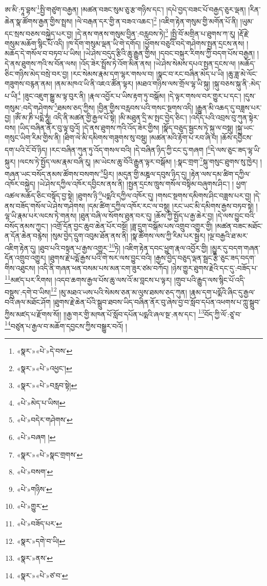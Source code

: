 ཨ་མི་:ཏཱ་བྷས་\footnote{«སྣར་»«པེ་»དེ་བས་}སྤྱི་གཙུག་བརྒྱན། །མཚན་བཟང་སུམ་ཅུ་རྩ་གཉིས་དང་། །དཔེ་བྱད་བཟང་པོ་བརྒྱད་ཅུར་ལྡན། །རིན་ཆེན་སྣ་ཚོགས་རྒྱན་གྱིས་སྤྲས། །ལེ་བརྒན་དར་གྱི་ན་བཟའ་འཆང་།\footnote{«སྣར་»«པེ་»འཕྱང་།} །འཇིག་རྟེན་གསུམ་གྱི་མགོན་པོ་ནི། །ཡུམ་དང་སྲས་བཅས་བསྐྱེད་པར་བྱ། །དེ་ནས་གནས་གསུམ་བྱིན་:བརླབས་ཏེ།\footnote{«སྣར་»«པེ་»བརླབ་སྟེ།} །སྤྱི་བོ་མགྲིན་པ་ཐུགས་ཀ་རུ། །རྡོ་རྗེ་གསུམ་མཆོག་སྙིང་པོ་འདི། །ཁ་དོག་གསུམ་ལྡན་ཡི་གེ་དགོད། །ཕྱོགས་བཅུའི་བདེ་གཤེགས་སྤྱན་དྲངས་ནས། །མཆོད་དེ་གསོལ་བ་བཏབ་པ་ཡིས། །ཡེ་ཤེས་བདུད་རྩིའི་ཆུ་རྒྱུན་གྱིས། །དབང་བསྐུར་རིགས་ཀྱི་བདག་པོས་བརྒྱན། །དེ་ནས་ཐུགས་ཀའི་ས་བོན་ལས། །འོད་ཟེར་སྤྲོས་ཏེ་འོག་མིན་ནས། །ཡེ་ཤེས་སེམས་དཔའ་སྤྱན་དྲངས་ལ། །མཆོད་ཅིང་གཉིས་མེད་བསྲེ་བར་བྱ། །རང་སེམས་རྣམ་དག་ལྷར་གསལ་བ། །སྣང་བ་རང་བཞིན་མེད་པ་ཡི། །ཆུ་ཟླ་མེ་ལོང་གཟུགས་བརྙན་ནམ། །ནམ་མཁའ་ཡི་ནི་འཇའ་ཚོན་ལྟར། །མཐའ་གཉིས་ལས་གྲོལ་ལྷ་ཡི་སྐུ། །སྐུ་བཅས་སྐུ་ནི་:མེད་པ་ཡི།\footnote{«པེ་»མེད་པ་ཡིས།} །ཟུང་འཇུག་སྒྱུ་མ་ལྟ་བུར་ནི། །རྣལ་འབྱོར་པ་ཡིས་རྟག་ཏུ་བསྒོམ། །དེ་ལྟར་གསལ་བར་གྱུར་པ་དང་། །དུས་གསུམ་:བདེ་གཤེགས་\footnote{«པེ་»བདེར་གཤེགས་}ཐམས་ཅད་ཀྱིས། །བྱིན་གྱིས་བརླབས་པའི་གསང་སྔགས་འདི། །རྒྱུན་མི་འཆད་དུ་བཟླས་པར་བྱ། །ཨོཾ་མ་ཎི་པདྨེ་ཧཱུཾ། འདི་ནི་མཚན་གྱི་རྒྱལ་པོ་སྟེ། །མི་མཐུན་དྲི་མ་སྤང་བྱེད་ཅིང་། །འདོད་པའི་འབྲས་བུ་ཀུན་སྟེར་བས། །ཡིད་བཞིན་ནོར་བུ་ལྟ་བུའོ། །དེ་ནས་ཐུགས་ཀའི་འོད་ཟེར་གྱིས། །སྣོད་བཅུད་སྦྱངས་ཏེ་སྐུ་ལ་བསྡུ། །སྐུ་ཡང་གསུང་ཡིག་རིམ་གྱིས་ནི། །ཐིག་ལེ་མི་དམིགས་གཟུགས་སུ་བསྡུ། །མཚན་མའི་རྟོག་པ་རབ་ཞི་བ། །ཆོས་དབྱིངས་དག་པའི་ངོ་བོ་ཉིད། །རང་བཞིན་ཀུན་ཏུ་འོད་གསལ་བའི། །དེ་བཞིན་ཉིད་ཀྱི་ངང་དུ་གཞག །\footnote{«པེ་»བཞག །}དེ་ལས་ཅུང་ཟད་ལྷ་ཡི་སྐུར། །ལངས་ཏེ་སྤྱོད་ལམ་རྣམ་བཞི་རུ། །མ་ཡེངས་ཆུ་བོའི་རྒྱུན་ལྟར་བསྒོམ། །:སྣང་གྲག་\footnote{«སྣར་»«པེ་»སྣང་གྲགས་}སྐུ་གསུང་ཐུགས་སུ་ཁྱེར། །གཞན་ཡང་བསོད་ནམས་ཚོགས་བསགས་\footnote{«པེ་»བསག་}ཕྱིར། །མདུན་གྱི་མཎྜལ་དབུས་ཉིད་དུ། །རྟེན་ལས་དམ་ཚིག་དཀྱིལ་འཁོར་བསྐྱེད། །ཡེ་ཤེས་དཀྱིལ་འཁོར་དབྱིངས་ནས་ནི། །སྤྱན་དྲངས་ཁྲུས་གསོལ་བསྟིམ་བཞུགས་ཤིང་། །
ཕྱག་འཚལ་མཆོད་ཅིང་བསྟོད་བྱ་སྟེ། །ཐུགས་ཉི་\footnote{«པེ་»གཉིས་}པདྨའི་དཀྱིལ་འཁོར་དུ། །གསང་སྔགས་དམིགས་ཤིང་བཟླས་པར་བྱ། །དེ་ནས་བཟོད་གསོལ་ཡེ་ཤེས་གཤེགས། །དམ་ཚིག་དཀྱིལ་འཁོར་རང་ལ་བསྡུ། །རང་ཡང་མི་དམིགས་རྒྱས་བཏབ་སྟེ། །ལྷ་ཡི་རྣམ་པར་ལངས་ཏེ་གནས། །ཐུན་བཞི་ལ་སོགས་ཐུན་བར་དུ། །ཆོས་ཀྱི་སྤྱོད་པ་རྒྱ་ཆེར་བྱ། །དེ་ལས་བྱུང་བའི་བསོད་ནམས་ཀྱང་། །འགྲོ་དོན་བྱང་ཆུབ་ཆེན་པོར་བསྔོ། །ཟླ་དྲུག་བསྒོམ་པས་འགྲུབ་འགྱུར་གྱི། །མཚན་བཟང་མཐོང་ན་དོན་ཆེན་བརྙེས། །སུམ་བྱེད་དྲུག་འབུམ་ཐོན་ནས་ནི། །སྣ་ཚོགས་ལས་ཀྱི་རིམ་པར་སྦྱར། །ལྔ་བརྒྱའི་ཐ་མར་འཇིག་རྟེན་དུ། །ཐུབ་པའི་བསྟན་པ་རྒྱས་འགྱུར་\footnote{«པེ་»གྱུར་}ཏེ། །འཇིག་རྟེན་དབང་ཕྱུག་རྣལ་འབྱོར་གྱི། །མྱུར་དུ་བདག་གཞན་དོན་འགྲུབ་འགྱུར། །ཐུགས་རྗེ་པདྨོ་རྒྱས་པའི་གེ་སར་ལས་བྱུང་བའི། །རྒྱས་བྱེད་བཅུད་ལྡན་སྦྲང་རྩི་ཅུང་ཟད་བདག་གིས་འཐུངས། །འདི་ནི་གཞན་ཕན་བསམ་པས་མན་ངག་ཟུར་ཙམ་བཀོད། །ཉེས་གྱུར་ཐུགས་རྗེའི་དང་དུ་:བཟོད་པ་\footnote{«པེ་»བཟོད་པར་}མཛད་པར་རིགས། །འདབ་ཆགས་རྒྱལ་པོས་ཆུ་ལས་འོ་མ་བླངས་པ་ལྟར། །གྲུབ་པའི་རྒྱུད་ལས་སྙིང་པོ་འདི་བསྡུས་:དགེ་བ་ཡིས།\footnote{«སྣར་»དགེ་བ་ཡི།} །མུ་མཐའ་ཡས་པའི་སེམས་ཅན་མ་ལུས་ཐམས་ཅད་ཀུན། །རྣམ་དག་པདྨོའི་ཞིང་དུ་རྒྱལ་བའི་ཞལ་མཐོང་ཤོག །ཐུགས་རྗེ་ཆེན་པོའི་སྒྲུབ་ཐབས་ཡིད་བཞིན་ནོར་བུ་ཞེས་བྱ་བ་སློབ་དཔོན་འཕགས་པ་ཀླུ་སྒྲུབ་ཀྱིས་མཛད་པ་རྫོགས་སོ།། །།རྒྱ་གར་གྱི་མཁན་པོ་སློབ་དཔོན་པདྨའི་ཞལ་སྔ་:ནས་དང་། \footnote{«སྣར་»ནས་}བོད་ཀྱི་ལོ་:ཙཱ་བ་\footnote{«སྣར་»«པེ་»ཙ་བ་}བཙུན་པ་རྒྱལ་བ་མཆོག་དབྱངས་ཀྱིས་བསྒྱུར་བའོ། ། 